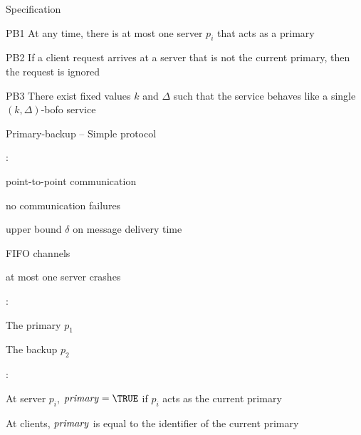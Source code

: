 \begin{frame}{Specification}
\BIL
\item[PB1] At any time, there is \alert{at most} one server $p_i$ that acts as
a primary
\item[PB2] If a client request arrives at a server that is not the current
primary, then the request is ignored
\item[PB3] There exist fixed values $k$ and $\Delta$ such that the service
behaves like a single $(k, \Delta)$-bofo service
\EIL
\end{frame}

\begin{frame}{Primary-backup -- Simple protocol}
	
:\\
\BI
\item point-to-point communication
\item no communication failures
\item upper bound $\delta$ on message delivery time
\item FIFO channels
\item at most one server crashes
\EI

\smallskip
{}:\\
\BI
\item The primary $p_1$
\item The backup $p_2$	
\EI	

\smallskip
{}:\\
\BI
\item At server $p_i$, $\isPrimary = \TRUE$ if $p_i$ acts as the current
primary
\item At clients, $\mathit{primary}$ is equal to the identifier of the current primary
\EI
	
	
\end{frame}

